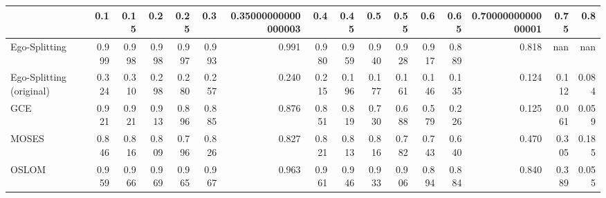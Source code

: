 \begin{tabular}{lrrrrrrrrrrrrrrr}
\toprule
{} &   0.1 &  0.15 &   0.2 &  0.25 &   0.3 & 0.35000000000000003 &   0.4 &  0.45 &   0.5 &  0.55 &   0.6 &  0.65 & 0.7000000000000001 &  0.75 &   0.8 \\
\midrule
Ego-Splitting            & 0.999 & 0.998 & 0.998 & 0.997 & 0.993 &               0.991 & 0.980 & 0.959 & 0.940 & 0.928 & 0.917 & 0.889 &              0.818 &   nan &   nan \\
Ego-Splitting (original) & 0.324 & 0.310 & 0.298 & 0.280 & 0.257 &               0.240 & 0.215 & 0.196 & 0.177 & 0.161 & 0.146 & 0.135 &              0.124 & 0.112 & 0.084 \\
GCE                      & 0.921 & 0.921 & 0.913 & 0.896 & 0.885 &               0.876 & 0.851 & 0.819 & 0.730 & 0.688 & 0.579 & 0.226 &              0.125 & 0.061 & 0.059 \\
MOSES                    & 0.846 & 0.816 & 0.809 & 0.796 & 0.826 &               0.827 & 0.821 & 0.813 & 0.816 & 0.782 & 0.743 & 0.640 &              0.470 & 0.305 & 0.185 \\
OSLOM                    & 0.959 & 0.966 & 0.969 & 0.965 & 0.967 &               0.963 & 0.961 & 0.946 & 0.933 & 0.906 & 0.894 & 0.884 &              0.840 & 0.389 & 0.055 \\
\bottomrule
\end{tabular}
